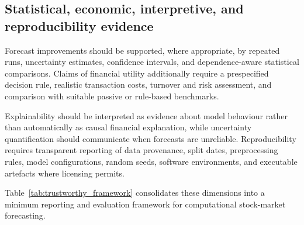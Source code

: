 \documentclass[pdflatex,sn-mathphys-num]{sn-jnl}%
\theoremstyle{thmstyleone}%
\theoremstyle{thmstyletwo}%
\theoremstyle{thmstylethree}%
\begin{document}
\subsection{Statistical, economic, interpretive, and reproducibility evidence}

Forecast improvements should be supported, where appropriate, by repeated
runs, uncertainty estimates, confidence intervals, and dependence-aware
statistical comparisons. Claims of financial utility additionally require a
prespecified decision rule, realistic transaction costs, turnover and risk
assessment, and comparison with suitable passive or rule-based benchmarks.

Explainability should be interpreted as evidence about model behaviour
rather than automatically as causal financial explanation, while uncertainty
quantification should communicate when forecasts are unreliable.
Reproducibility requires transparent reporting of data provenance, split
dates, preprocessing rules, model configurations, random seeds, software
environments, and executable artefacts where licensing permits.

Table~\ref{tab:trustworthy_framework} consolidates these dimensions into a
minimum reporting and evaluation framework for computational stock-market
forecasting.
\end{document}

